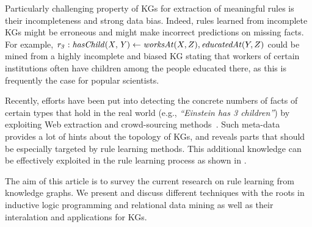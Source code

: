 Particularly challenging property of KGs for extraction of meaningful rules is their incompleteness and strong data bias. 
Indeed, rules learned from incomplete KGs might be erroneous and might make incorrect predictions on missing facts. 
For example, $\mathit{r_3}: \mathit{hasChild(X,Y)}\leftarrow \mathit{worksAt}(X,Z),\mathit{educatedAt}(Y,Z)$ could be mined from a highly incomplete and biased KG stating that workers of certain institutions often have children among the people educated there, 
as this is frequently the case for popular scientists.

Recently, efforts have been put into detecting the concrete numbers of 
facts of certain types that hold in the real world 
(e.g., \emph{``Einstein has 3 children''}) by exploiting Web extraction and crowd-sourcing methods~\cite{cardinality-extraction-iswc-2016,cool-wd}. Such 
meta-data provides a lot of hints about the topology of KGs, and reveals 
parts that should be especially targeted by rule learning methods.
This additional knowledge can be effectively exploited in the rule learning process as shown in \cite{carl}.



The aim of this article is to survey the current research on rule learning from knowledge graphs. We present and discuss different techniques with the roots in inductive logic programming and relational data mining as well as their interalation and applications for KGs. 



